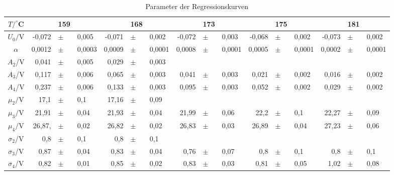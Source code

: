  \begin{table}[h]
    \centering
    \begin{tabular}{c | r p{0.05cm} l r p{0.05cm} l r p{0.05cm} l r p{0.05cm} l r p{0.05cm} l}
      \toprule
       $T/^\circ$C & & 159 & & & 168 & & & 173 & & & 175 & & & 181& \\  
      \midrule
      $U_0/$V &              -0,072         &$\pm$ & 0,005      &   -0,071        &$\pm$ & 0,002     & -0,072  & $\pm$ &  0,003  &  -0,068  & $\pm$  & 0,002 & -0,073 & $\pm$ & 0,002\\    
      $\alpha$& 0,0012         &$\pm$ & 0,0003    &  0,0009        &$\pm$ & 0,0001    & 0,0008  & $\pm$ & 0,0001   &   0,0005 & $\pm$  & 0,0001 & 0,0002 & $\pm$ & 0,0001\\
      $A_2$/V &              0,041         &$\pm$ & 0,005     &   0,029          &$\pm$ & 0,003    &   &  &   &    &   &  & & &\\ 
      $A_3$/V &              0,117         &$\pm$ & 0,006     &   0,065         &$\pm$ & 0,003    &  0,041 & $\pm$ & 0,003   &  0,021  & $\pm$  & 0,002 & 0,016 & $\pm$ & 0,002\\ 
      $A_4$/V &              0,237          &$\pm$ & 0,006     &   0,133          &$\pm$ & 0,003    & 0,095  & $\pm$ & 0,003   &  0,052  & $\pm$  & 0,002 & 0,029 & $\pm$ & 0,002\\ 
      $\mu_2/$V &            17,1          &$\pm$ & 0,1     &   17,16            &$\pm$ & 0,09     &   &  &    &   &   & & & &\\ 
      $\mu_3/$V &            21,91          &$\pm$ & 0,04     &   21,93          &$\pm$ & 0,04    &  21,99 & $\pm$ & 0,06   &  22,2  & $\pm$  & 0,1 & 22,27 & $\pm$ & 0,09\\ 
      $\mu_4/$V &            26,87,           &$\pm$ & 0,02      &   26,82           &$\pm$ & 0,02     & 26,83  & $\pm$ & 0,03   &   26,89 & $\pm$  & 0,04 & 27,23 & $\pm$ & 0,06\\ 
      $\sigma_2$/V &         0,8          &$\pm$ & 0,1      &   0,8          &$\pm$ & 0,1     &   &  &   &    &  &  &  & & \\ 
      $\sigma_3$/V &         0,87         &$\pm$ & 0,04     &   0,83          &$\pm$ & 0,04    & 0,76  & $\pm$ &  0,07  &  0,8  & $\pm$  & 0,1 & 0,8 & $\pm$ & 0,1\\ 
      $\sigma_4$/V &         0,82         &$\pm$ & 0,01      &   0,85         &$\pm$ & 0,02    & 0,83  & $\pm$ & 0,03   &   0,81 & $\pm$  & 0,05 & 1,02 & $\pm$ & 0,08\\ 
      \bottomrule
    \end{tabular}
    \caption{Parameter der Regressionskurven}
    \label{tab:fh_parameter_2}
  \end{table}

